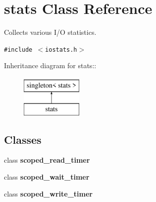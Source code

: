 \hypertarget{classstats}{
\section{stats Class Reference}
\label{classstats}
}
Collects various I/O statistics.  


{\tt \#include $<$iostats.h$>$}

Inheritance diagram for stats::\begin{figure}[H]
\begin{center}
\leavevmode
\includegraphics[height=2cm]{classstats}
\end{center}
\end{figure}
\subsection*{Classes}
\begin{CompactItemize}
\item 
class \textbf{scoped\_\-read\_\-timer}
\item 
class \textbf{scoped\_\-wait\_\-timer}
\item 
class \textbf{scoped\_\-write\_\-timer}
\end{CompactItemize}
